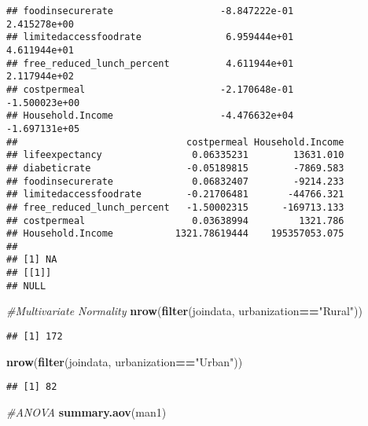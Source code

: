 \documentclass[]{article}
\newenvironment{Shaded}{\begin{snugshade}}{\end{snugshade}}
\newcommand{\CommentTok}[1]{\textcolor[rgb]{0.56,0.35,0.01}{\textit{#1}}}
\newcommand{\KeywordTok}[1]{\textcolor[rgb]{0.13,0.29,0.53}{\textbf{#1}}}
\newcommand{\NormalTok}[1]{#1}
\newcommand{\OperatorTok}[1]{\textcolor[rgb]{0.81,0.36,0.00}{\textbf{#1}}}
\newcommand{\StringTok}[1]{\textcolor[rgb]{0.31,0.60,0.02}{#1}}
\begin{document}
\begin{verbatim}
## foodinsecurerate                   -8.847222e-01               2.415278e+00
## limitedaccessfoodrate               6.959444e+01               4.611944e+01
## free_reduced_lunch_percent          4.611944e+01               2.117944e+02
## costpermeal                        -2.170648e-01              -1.500023e+00
## Household.Income                   -4.476632e+04              -1.697131e+05
##                              costpermeal Household.Income
## lifeexpectancy                0.06335231        13631.010
## diabeticrate                 -0.05189815        -7869.583
## foodinsecurerate              0.06832407        -9214.233
## limitedaccessfoodrate        -0.21706481       -44766.321
## free_reduced_lunch_percent   -1.50002315      -169713.133
## costpermeal                   0.03638994         1321.786
## Household.Income           1321.78619444    195357053.075
## 
## [1] NA
## [[1]]
## NULL
\end{verbatim}

\begin{Shaded}
\begin{Highlighting}[]
\CommentTok{#Multivariate Normality}
\KeywordTok{nrow}\NormalTok{(}\KeywordTok{filter}\NormalTok{(joindata, urbanization}\OperatorTok{==}\StringTok{"Rural"}\NormalTok{))}
\end{Highlighting}
\end{Shaded}

\begin{verbatim}
## [1] 172
\end{verbatim}

\begin{Shaded}
\begin{Highlighting}[]
\KeywordTok{nrow}\NormalTok{(}\KeywordTok{filter}\NormalTok{(joindata, urbanization}\OperatorTok{==}\StringTok{"Urban"}\NormalTok{))}
\end{Highlighting}
\end{Shaded}

\begin{verbatim}
## [1] 82
\end{verbatim}

\begin{Shaded}
\begin{Highlighting}[]
\CommentTok{#ANOVA}
\KeywordTok{summary.aov}\NormalTok{(man1)}
\end{Highlighting}
\end{Shaded}
\end{document}
